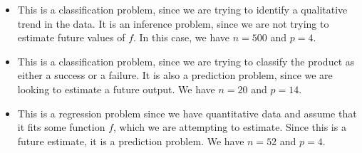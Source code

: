 \begin{itemize}
    \item[(a)] This is a classification problem, since we are trying to identify
        a qualitative trend in the data. It is an inference problem,
        since we are not
        trying to estimate future values of $f$. In this case, we have $n = 500$ and
        $p = 4$.
    \item[(b)] This is a classification problem, since we are trying to classify
        the product as either a success or a failure. It is also a
        prediction problem,
        since we are looking to estimate a future output. We have $n =
        20$ and $p = 14$.
    \item[(c)] This is a regression problem since we have quantitative data and
        assume that it fits some function $f$, which we are attempting to estimate.
        Since this is a future estimate, it is a prediction problem. We
        have $n = 52$
        and $p = 4$.
\end{itemize}

